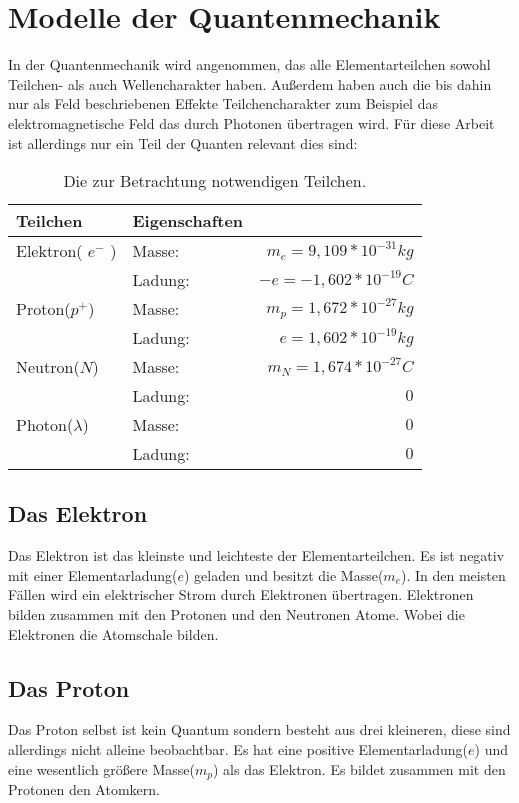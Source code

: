 \documentclass[11pt,a4paper,oneside]{report}
\begin{document}
\section{Modelle der Quantenmechanik}
In der Quantenmechanik wird angenommen, das alle Elementarteilchen sowohl Teilchen- als auch Wellencharakter haben. Außerdem haben auch die bis dahin nur als Feld beschriebenen Effekte Teilchencharakter zum Beispiel das elektromagnetische Feld das durch Photonen übertragen wird.
Für diese Arbeit ist allerdings nur ein Teil der Quanten relevant dies sind:
\begin{table}[h]
\centering
\begin{tabular}{|l|lr|} \hline
Teilchen 				& Eigenschaften 	&  						\\  \hline
Elektron( $e^-$ ) 		& Masse: 			& $m_e=9,109*10^{-31}kg$	\\
					& Ladung: 		& $-e=-1,602*10^{-19}C$	\\ \hline
Proton($p^+$) 		& Masse: 			& $m_p=1,672*10^{-27}kg$ 	\\
 					& Ladung: 		& $e=1,602*10^{-19}kg$	\\ \hline 
Neutron($N$)			& Masse:			& $m_N=1,674*10^{-27}C$	\\ 
					& Ladung:		& $0$					\\ \hline
Photon($ \lambda $) 	& Masse: 			& $0$					\\ 
					&Ladung:			& $0$					\\ \hline
\end{tabular}
\caption{Die zur Betrachtung notwendigen Teilchen.\cite{stroppe08}}
\end{table}

\subsection{Das Elektron}
Das Elektron ist das kleinste und leichteste der Elementarteilchen. Es ist negativ mit einer Elementarladung($e$) geladen und besitzt die Masse($m_e$). In den meisten Fällen wird ein elektrischer Strom durch Elektronen übertragen. Elektronen bilden zusammen mit den Protonen und den Neutronen Atome. Wobei die Elektronen die Atomschale bilden.

\subsection{Das Proton}
Das Proton selbst ist kein Quantum sondern besteht aus drei kleineren, diese sind allerdings nicht alleine beobachtbar. Es hat eine positive Elementarladung($e$) und eine wesentlich größere Masse($m_p$) als das Elektron. Es bildet zusammen mit den Protonen den Atomkern.
\end{document}
